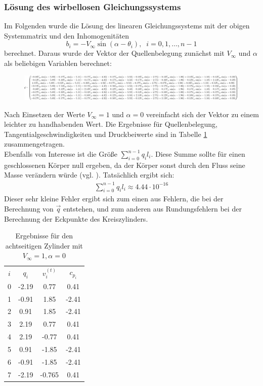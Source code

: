 \subsubsection{Lösung des wirbellosen Gleichungssystems}
Im Folgenden wurde die Lösung des linearen Gleichungssystems mit der obigen Systemmatrix und den Inhomogenitäten
\begin{equation}
b_i =  -V_{\infty} \sin{(\alpha -\theta _i)}, \;\; i= 0,1,\ldots, n-1
\end{equation}
berechnet. Daraus wurde der Vektor der Quellenbelegung zunächst mit $V_{\infty}$ und $\alpha $ als beliebigen Variablen berechnet: \\
\begin{figure}[!h]
\begin{center}
\includegraphics[scale=0.2]{figures/analytical.png} 
\label{fig:analyticalcylinder8}
\end{center}
\end{figure}

Nach Einsetzen der Werte $V_{\infty} = 1$ und $\alpha  = 0$ vereinfacht sich der Vektor zu einem leichter zu handhabenden Wert. Die Ergebnisse für Quellenbelegung, Tangentialgeschwindigkeiten und Druckbeiwerte sind in Tabelle \ref{tab:cyl8} zusammengetragen. \\
Ebenfalls von Interesse ist die Größe $\sum_{i=0}^{n-1} q_i l_i$. Diese Summe sollte für einen geschlossenen Körper null ergeben, da der Körper sonst durch den Fluss seine Masse verändern würde (vgl. \cite{Barba:2019}). Tatsächlich ergibt sich:
\begin{align*}
\sum_{i=0}^{n-1} q_i l_i \approx 4.44 \cdot 10^{-16}
\end{align*}
Dieser sehr kleine Fehler ergibt sich zum einen aus Fehlern, die bei der Berechnung von $\vec q$ entstehen, und zum anderen aus Rundungsfehlern bei der Berechnung der Eckpunkte des Kreiszylinders.

\begin{table}
\caption{Ergebnisse für den achtseitigen Zylinder mit $V_{\infty} = 1, \alpha  = 0$}
\label{tab:cyl8}
\begin{center}
\begin{tabular}{c|ccc}
$i$ & $q_i$ & $v_i^{(t)}$ & $c_{p_i}$ \\
0 & -2.19 & 0.77 & 0.41 \\
1 & -0.91 & 1.85 & -2.41 \\
2 & 0.91 & 1.85 & -2.41 \\
3 & 2.19 & 0.77 & 0.41 \\
4 & 2.19 & -0.77 &  0.41 \\ 
5 &  0.91 & -1.85 & -2.41 \\
6 & -0.91 & -1.85 & -2.41 \\
7 & -2.19 &-0.765 & 0.41
\end{tabular}
\end{center}
\end{table}

